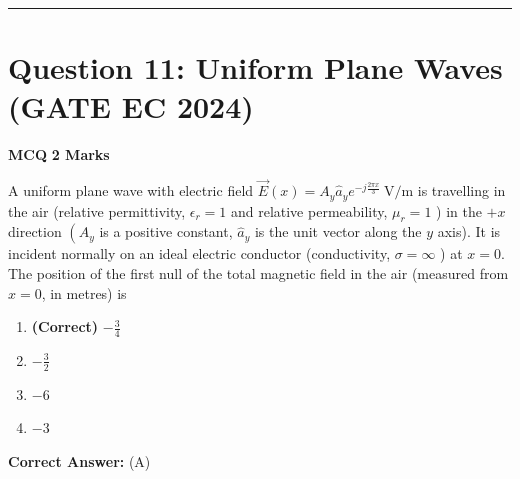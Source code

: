 \documentclass[11pt,a4paper]{article}
\begin{document}
\vspace{1.5em}
\hrule
\vspace{1.5em}

\section*{Question 11: Uniform Plane Waves (GATE EC 2024)}
\noindent \textbf{\color{primary}MCQ} \hfill \textbf{\color{secondary}2 Marks}


\noindent A uniform plane wave with electric field $\vec{E}(x)=A_{y} \hat{a}_{y} e^{-j \frac{2 \pi x}{3}} \mathrm{~V} / \mathrm{m}$ is travelling in the air (relative permittivity, $\epsilon_{r}=1$ and relative permeability, $\mu_{r}=1$ ) in the $+x$ direction $\left(A_{y}\right.$ is a positive constant, $\hat{a}_{y}$ is the unit vector along the $y$ axis). It is incident normally on an ideal electric conductor (conductivity, $\sigma=\infty$ ) at $x=0$. The position of the first null of the total magnetic field in the air (measured from $x=0$, in metres) is \underline{\hspace{1.5cm}}


\begin{enumerate}[label=(\Alph*)]
    \item \textbf{(Correct)} $-\frac{3}{4}$
    \item $-\frac{3}{2}$
    \item $-6$
    \item $-3$
\end{enumerate}

\noindent \textbf{Correct Answer:} (A)
\end{document}
